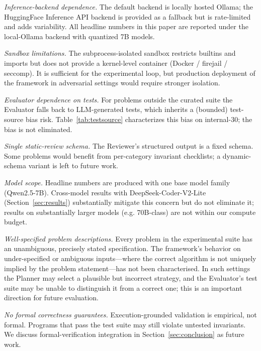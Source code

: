 \documentclass[journal]{IEEEtran}
\begin{document}
\textit{Inference-backend dependence.} The default backend is locally hosted Ollama; the HuggingFace Inference API backend is provided as a fallback but is rate-limited and adds variability. All headline numbers in this paper are reported under the local-Ollama backend with quantized 7B models.

\textit{Sandbox limitations.} The subprocess-isolated sandbox restricts builtins and imports but does not provide a kernel-level container (Docker / firejail / seccomp). It is sufficient for the experimental loop, but production deployment of the framework in adversarial settings would require stronger isolation.

\textit{Evaluator dependence on tests.} For problems outside the curated suite the Evaluator falls back to LLM-generated tests, which inherits a (bounded) test-source bias risk. Table~\ref{tab:testsource} characterizes this bias on internal-30; the bias is not eliminated.

\textit{Single static-review schema.} The Reviewer's structured output is a fixed schema. Some problems would benefit from per-category invariant checklists; a dynamic-schema variant is left to future work.

\textit{Model scope.} Headline numbers are produced with one base model family (Qwen2.5-7B). Cross-model results with DeepSeek-Coder-V2-Lite (Section~\ref{sec:results}) substantially mitigate this concern but do not eliminate it; results on substantially larger models (e.g. 70B-class) are not within our compute budget.

\textit{Well-specified problem descriptions.} Every problem in the experimental suite has an unambiguous, precisely stated specification. The framework's behavior on under-specified or ambiguous inputs---where the correct algorithm is not uniquely implied by the problem statement---has not been characterised. In such settings the Planner may select a plausible but incorrect strategy, and the Evaluator's test suite may be unable to distinguish it from a correct one; this is an important direction for future evaluation.

\textit{No formal correctness guarantees.} Execution-grounded validation is empirical, not formal. Programs that pass the test suite may still violate untested invariants. We discuss formal-verification integration in Section~\ref{sec:conclusion} as future work.


\end{document}
